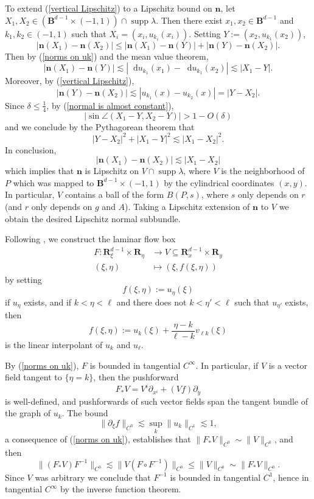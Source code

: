 \documentclass[reqno,11pt]{amsart}
\newcommand{\RR}{\mathbf{R}}
\newcommand{\Ball}{\mathbf{B}}
\newcommand*\dif{\mathop{}\!\mathrm{d}}
\DeclareMathOperator{\supp}{supp}
\newcommand{\normal}{\mathbf n}
\theoremstyle{definition}
\numberwithin{equation}{section}
\begin{document}
To extend (\ref{vertical Lipschitz}) to a Lipschitz bound on $\normal$, let $X_1, X_2 \in (\Ball^{d - 1} \times (-1, 1)) \cap \supp \lambda$.
Then there exist $x_1, x_2 \in \Ball^{d - 1}$ and $k_1, k_2 \in (-1, 1)$ such that $X_i = (x_i, u_{k_i}(x_i))$.
Setting $Y := (x_2, u_{k_1}(x_2))$,
$$|\normal(X_1) - \normal(X_2)| \leq |\normal(X_1) - \normal(Y)| + |\normal(Y) - \normal(X_2)|.$$
Then by (\ref{norms on uk}) and the mean value theorem,
$$|\normal(X_1) - \normal(Y)| \lesssim |\dif u_{k_1}(x_1) - \dif u_{k_1}(x_2)| \lesssim |X_1 - Y|.$$
Moreover, by (\ref{vertical Lipschitz}),
$$|\normal(Y) - \normal(X_2)| \lesssim |u_{k_1}(x) - u_{k_2}(x)| = |Y - X_2|.$$
Since $\delta \leq \frac{1}{4}$, by (\ref{normal is almost constant}),
$$|\sin \angle(X_1 - Y, X_2 - Y)| > 1 - O(\delta)$$
and we conclude by the Pythagorean theorem that
$$|Y - X_2|^2 + |X_1 - Y|^2 \lesssim |X_1 - X_2|^2.$$
In conclusion,
$$|\normal(X_1) - \normal(X_2)| \lesssim |X_1 - X_2|$$
which implies that $\normal$ is Lipschitz on $V \cap \supp \lambda$, where $V$ is the neighborhood of $P$ which was mapped to $\Ball^{d - 1} \times (-1, 1)$ by the cylindrical coordinates $(x, y)$.
In particular, $V$ contains a ball of the form $B(P, s)$, where $s$ only depends on $r$ (and $r$ only depends on $g$ and $A$).
Taking a Lipschitz extension of $\normal$ to $V$ we obtain the desired Lipschitz normal subbundle.

Following \cite[Appendix B]{ColdingMinicozziIV}, we construct the laminar flow box
\begin{align*}
	F: \RR^{d - 1}_\xi \times \RR_\eta &\to V \subseteq \RR^{d - 1}_x \times \RR_y \\
	(\xi, \eta) &\mapsto (\xi, f(\xi, \eta))
\end{align*}
by setting
$$f(\xi, \eta) := u_\eta(\xi)$$
if $u_\eta$ exists, and if $k < \eta < \ell$ and there does not $k < \eta' < \ell$ such that $u_{\eta'}$ exists, then
$$f(\xi, \eta) := u_k(\xi) + \frac{\eta - k}{\ell - k} v_{\ell k}(\xi)$$
is the linear interpolant of $u_k$ and $u_\ell$.

By (\ref{norms on uk}), $F$ is bounded in tangential $C^\infty$.
In particular, if $V$ is a vector field tangent to $\{\eta = k\}$, then the pushforward
$$F_* V = V^i \partial_{x^i} + (Vf) \partial_y$$
is well-defined, and pushforwards of such vector fields span the tangent bundle of the graph of $u_k$. 
The bound
\begin{equation}\label{xiLip of f}
	\|\partial_\xi f\|_{C^0} \lesssim \sup_k \|u_k\|_{C^1} \lesssim 1,
\end{equation}
a consequence of (\ref{norms on uk}), establishes that $\|F_* V\|_{C^0} \sim \|V\|_{C^0}$, and then 
$$\|(F_* V) F^{-1}\|_{C^0} \lesssim \|V(F \circ F^{-1})\|_{C^0} \leq \|V\|_{C^0} \sim \|F_* V\|_{C^0}.$$
Since $V$ was arbitrary we conclude that $F^{-1}$ is bounded in tangential $C^1$, hence in tangential $C^\infty$ by the inverse function theorem. 
\end{document}
